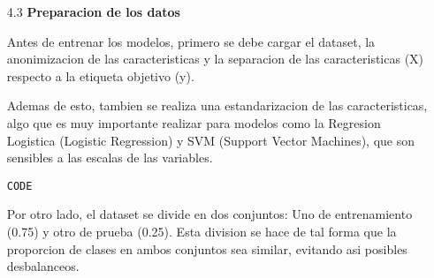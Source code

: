 \documentclass{article}
\begin{document}
\begin{itemize}

\item[4.3]  {\bf Preparacion de los datos}

Antes de entrenar los modelos, primero se debe cargar el dataset, la anonimizacion de las caracteristicas y la separacion de las caracteristicas (X) respecto a la etiqueta objetivo (y). 

Ademas de esto, tambien se realiza una estandarizacion de las caracteristicas, algo que es muy importante realizar para modelos como la Regresion Logistica (Logistic Regression) y SVM (Support Vector Machines), que son sensibles a las escalas de las variables.

\begin{tcolorbox}[width=14cm]
\begin{scriptsize}
\begin{verbatim}
CODE
\end{verbatim}
\end{scriptsize}
\end{tcolorbox}

Por otro lado, el dataset se divide en dos conjuntos: Uno de entrenamiento (0.75) y otro de prueba (0.25). Esta division se hace de tal forma que la proporcion de clases en ambos conjuntos sea similar, evitando asi posibles desbalanceos.

\end{itemize}

\bigskip
\end{document}

